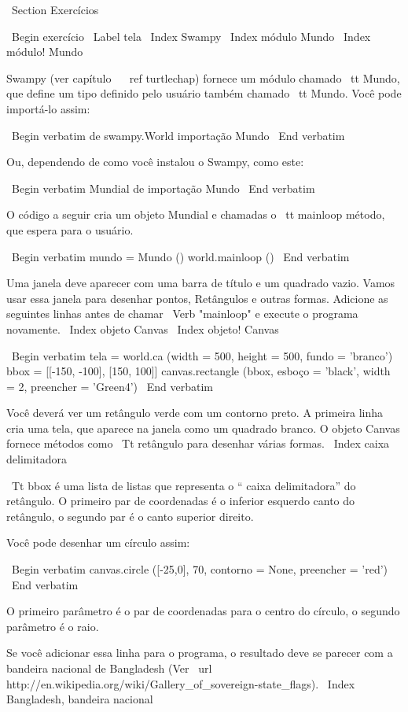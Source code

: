 \documentclass[10pt]{book}
\begin{document}
\begin {itemize}
{{{{{{{{{{{{{\ Section {Exercícios}

\ Begin {} exercício
\ Label {tela}
\ Index {} Swampy
\ Index {módulo Mundo}
\ Index {módulo! Mundo}

Swampy (ver capítulo ~ \ ref {turtlechap}) fornece um módulo chamado {\ tt
  Mundo}, que define um tipo definido pelo usuário também chamado {\ tt Mundo}.
Você pode importá-lo assim:

\ Begin {verbatim}
de swampy.World importação Mundo
\ End {verbatim}

Ou, dependendo de como você instalou o Swampy, como este:

\ Begin {verbatim}
Mundial de importação Mundo
\ End {verbatim}

O código a seguir cria um objeto Mundial e chamadas
o {\ tt mainloop} método, que
espera para o usuário.

\ Begin {verbatim}
mundo = Mundo ()
world.mainloop ()
\ End {verbatim}

Uma janela deve aparecer com uma barra de título e um quadrado vazio.
Vamos usar essa janela para desenhar pontos,
Retângulos e outras formas.  
Adicione as seguintes linhas antes de chamar
\ Verb "mainloop" e execute o programa novamente.
\ Index {objeto Canvas}
\ Index {objeto! Canvas}

\ Begin {verbatim}
tela = world.ca (width = 500, height = 500, fundo = 'branco')
bbox = [[-150, -100], [150, 100]]
canvas.rectangle (bbox, esboço = 'black', width = 2, preencher = 'Green4')
\ End {verbatim}

Você deverá ver um retângulo verde com um contorno preto.
A primeira linha cria uma tela, que aparece na janela
como um quadrado branco. O objeto Canvas fornece métodos como
{\ Tt retângulo} para desenhar várias formas.
\ Index {caixa delimitadora}

{\ Tt bbox} é uma lista de listas que representa o `` caixa delimitadora''
do retângulo. O primeiro par de coordenadas é o inferior esquerdo
canto do retângulo, o segundo par é o canto superior direito.

Você pode desenhar um círculo assim:

\ Begin {verbatim}
canvas.circle ([-25,0], 70, contorno = None, preencher = 'red')
\ End {verbatim}

O primeiro parâmetro é o par de coordenadas para o centro do
círculo, o segundo parâmetro é o raio.

Se você adicionar essa linha para o programa, 
o resultado deve se parecer com a bandeira nacional de Bangladesh
(Ver \ url {http://en.wikipedia.org/wiki/Gallery_of_sovereign-state_flags}).
\ Index {Bangladesh, bandeira nacional}

}}}}}}}}}}}}}
\end{itemize}
\end{document}

